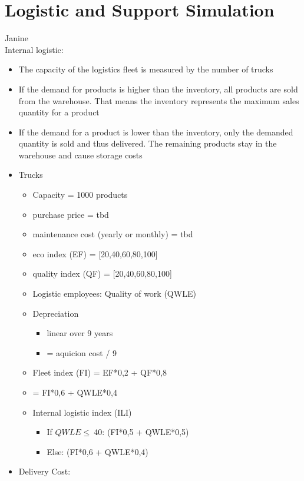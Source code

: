\documentclass[11pt,titlepage,oneside,openany]{book}
\begin{document}
\section{Logistic and Support Simulation}
Janine\\
Internal logistic:
\begin{itemize}
    \item The capacity of the logistics fleet is measured by the number of trucks
    \item If the demand for products is higher than the inventory, all products are sold from the warehouse. That means the inventory represents the maximum sales quantity for a product
    \item If the demand for a product is lower than the inventory, only the demanded quantity is sold and thus delivered. The remaining products stay in the warehouse and cause storage costs 
    \item Trucks
    \begin{itemize}
        \item Capacity = 1000 products  
        \item purchase price = tbd 
        \item maintenance cost (yearly or monthly) = tbd
        \item eco index (EF) = [20,40,60,80,100]
        \item quality index (QF) = [20,40,60,80,100]
        \item Logistic employees: Quality of work (QWLE)
        \item Depreciation 
        \begin{itemize}
            \item linear over 9 years
            \item = aquicion cost / 9 
        \end{itemize}
        \item Fleet index (FI) = EF*0,2 + QF*0,8
        \item  = FI*0,6 + QWLE*0,4
        \item Internal logistic index (ILI)
        \begin{itemize}
            \item If $QWLE \leq \ $40: (FI*0,5 + QWLE*0,5)
            \item Else: (FI*0,6 + QWLE*0,4)
        \end{itemize}
    \end{itemize}
    \item Delivery Cost:
    \begin{itemize}

\end{itemize}
\end{itemize}
\end{document}
